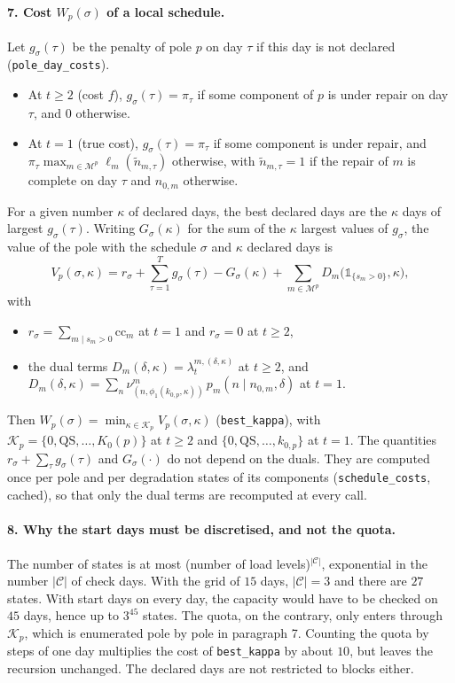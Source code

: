 \documentclass[11pt]{article}
\begin{document}
\paragraph{7. Cost $W_p(\sigma)$ of a local schedule.} Let $g_\sigma(\tau)$ be the penalty of pole $p$
on day $\tau$ if this day is not declared (\texttt{pole\_day\_costs}).
\begin{itemize}
  \item At $t \ge 2$ (cost $f$), $g_\sigma(\tau) = \pi_\tau$ if some component of $p$ is under repair
        on day $\tau$, and $0$ otherwise.
  \item At $t = 1$ (true cost), $g_\sigma(\tau) = \pi_\tau$ if some component is under repair, and
        $\pi_\tau \max_{m \in \mathcal M^p} \ell_m(\tilde n_{m,\tau})$ otherwise, with $\tilde n_{m,\tau} =
        1$ if the repair of $m$ is complete on day $\tau$ and $n_{0,m}$ otherwise.
\end{itemize}
For a given number $\kappa$ of declared days, the best declared days are the $\kappa$ days of largest
$g_\sigma(\tau)$. Writing $G_\sigma(\kappa)$ for the sum of the $\kappa$ largest values of
$g_\sigma$, the value of the pole with the schedule $\sigma$ and $\kappa$ declared days is
\[
  V_p(\sigma, \kappa) = r_\sigma + \sum_{\tau = 1}^{T} g_\sigma(\tau) - G_\sigma(\kappa)
  + \sum_{m \in \mathcal M^p} D_m\big(\mathbb 1_{\{s_m > 0\}}, \kappa\big),
\]
with
\begin{itemize}
  \item $r_\sigma = \sum_{m \mid s_m > 0} \mathrm{cc}_m$ at $t = 1$ and $r_\sigma = 0$ at $t \ge 2$,
  \item the dual terms $D_m(\delta, \kappa) = \lambda_t^{m, (\delta, \kappa)}$ at $t \ge 2$, and
        $D_m(\delta, \kappa) = \sum_n \nu^m_{(n, \phi_1(k_{0,p}, \kappa))}\, p_m(n \mid n_{0,m},
        \delta)$ at $t = 1$.
\end{itemize}
Then $W_p(\sigma) = \min_{\kappa \in \mathcal K_p} V_p(\sigma, \kappa)$ (\texttt{best\_kappa}), with
$\mathcal K_p = \{0, \mathrm{QS}, \ldots, K_0(p)\}$ at $t \ge 2$ and $\{0, \mathrm{QS}, \ldots,
k_{0,p}\}$ at $t = 1$. The quantities $r_\sigma + \sum_\tau g_\sigma(\tau)$ and $G_\sigma(\cdot)$ do
not depend on the duals. They are computed once per pole and per degradation states of its
components (\texttt{schedule\_costs}, cached), so that only the dual terms are recomputed at every
call.

\paragraph{8. Why the start days must be discretised, and not the quota.} The number of states is at
most (number of load levels)$^{|\mathcal C|}$, exponential in the number $|\mathcal C|$ of check days.
With the grid of $15$ days, $|\mathcal C| = 3$ and there are $27$ states. With start days on every
day, the capacity would have to be checked on $45$ days, hence up to $3^{45}$ states. The quota, on
the contrary, only enters through $\mathcal K_p$, which is enumerated pole by pole in paragraph 7.
Counting the quota by steps of one day multiplies the cost of \texttt{best\_kappa} by about $10$, but
leaves the recursion unchanged. The declared days are not restricted to blocks either.
\end{document}
